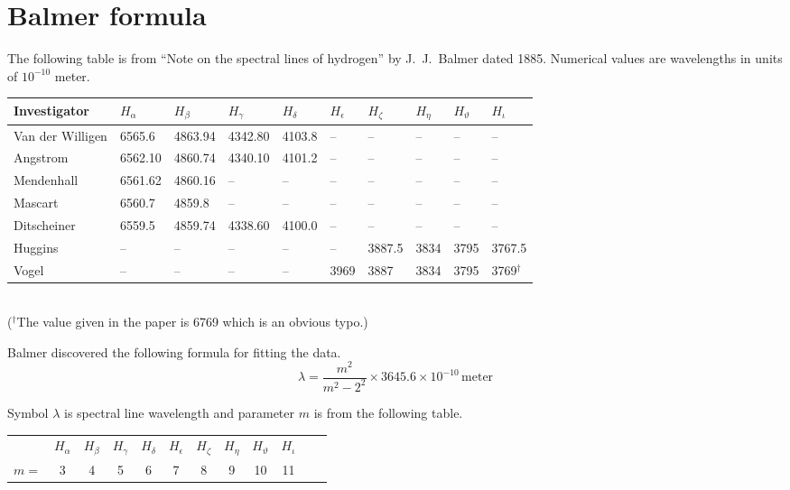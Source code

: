 \documentclass[12pt]{article}
\begin{document}
\section*{Balmer formula}

The following table is from
``Note on the spectral lines of hydrogen''
by J.~J.~Balmer dated 1885.
Numerical values are wavelengths in units of $10^{-10}$ meter.
\begin{center}
\footnotesize
\begin{tabular}{|l|l|l|l|l|l|l|l|l|l|}
\hline
Investigator & $H_\alpha$ & $H_\beta$ & $H_\gamma$ & $H_\delta$ & $H_\epsilon$ &
$H_\zeta$ & $H_\eta$ & $H_\vartheta$ & $H_\iota$
\\
\hline
Van der Willigen & 6565.6 & 4863.94 & 4342.80 & 4103.8 & -- & -- & -- & -- & --
\\
Angstrom & 6562.10 & 4860.74 & 4340.10 & 4101.2 & -- & -- & -- & -- & --
\\
Mendenhall & 6561.62 & 4860.16 & -- & -- & -- & -- & -- & -- & --
\\
Mascart & 6560.7 & 4859.8 & -- & -- & -- & -- & -- & -- & --
\\
Ditscheiner & 6559.5 & 4859.74 & 4338.60 & 4100.0 & -- & -- & -- & -- & --
\\
Huggins & -- & -- & -- & -- & -- & 3887.5 & 3834 & 3795 & 3767.5
\\
Vogel & -- & -- & -- & -- & 3969 & 3887 & 3834 & 3795 & 3769${}^\dag$
\\
\hline
\end{tabular}
\\
{\footnotesize(${}^\dag$The value given in the paper is 6769 which is an obvious typo.)}
\end{center}

Balmer discovered the following formula for fitting the data.
\begin{equation*}
\lambda=\frac{m^2}{m^2-2^2}\times3645.6\times10^{-10}\,\text{meter}
\end{equation*}

Symbol $\lambda$ is spectral line wavelength and parameter $m$ is from the following table.
\begin{center}
\begin{tabular}{cccccccccccc}
& $H_\alpha$ & $H_\beta$ & $H_\gamma$ & $H_\delta$ & $H_\epsilon$ &
$H_\zeta$ & $H_\eta$ & $H_\vartheta$ & $H_\iota$
\\
$m=$ & 3 & 4 & 5 & 6 & 7 & 8 & 9 & 10 & 11
\end{tabular}
\end{center}
\end{document}
